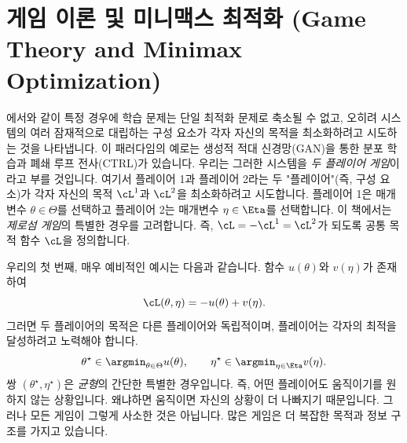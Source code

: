 \documentclass[../../book-main_ko.tex]{subfiles}
\begin{document}
\section{게임 이론 및 미니맥스 최적화 (Game Theory and Minimax Optimization)} \label{sec:minimax}\label{sec:game_theory}

에서와 같이 특정 경우에 학습 문제는 단일 최적화 문제로 축소될 수 없고, 오히려 시스템의 여러 잠재적으로 대립하는 구성 요소가 각자 자신의 목적을 최소화하려고 시도하는 것을 나타냅니다. 이 패러다임의 예로는 생성적 적대 신경망(GAN)을 통한 분포 학습과 폐쇄 루프 전사(CTRL)가 있습니다. 우리는 그러한 시스템을 \textit{두 플레이어 게임}이라고 부를 것입니다. 여기서 플레이어 1과 플레이어 2라는 두 "플레이어"(즉, 구성 요소)가 각자 자신의 목적 \(\cL^{1}\)과 \(\cL^{2}\)을 최소화하려고 시도합니다. 플레이어 1은 매개변수 \(\theta \in \Theta\)를 선택하고 플레이어 2는 매개변수 \(\eta \in \Eta\)를 선택합니다. 이 책에서는 \textit{제로섬 게임}의 특별한 경우를 고려합니다. 즉, \(\cL = -\cL^{1} = \cL^{2}\)가 되도록 공통 목적 함수 \(\cL\)을 정의합니다.

우리의 첫 번째, 매우 예비적인 예시는 다음과 같습니다. 함수 \(u(\theta)\)와 \(v(\eta)\)가 존재하여
\begin{equation}
    \cL(\theta, \eta) = -u(\theta) + v(\eta).
\end{equation}
그러면 두 플레이어의 목적은 다른 플레이어와 독립적이며, 플레이어는 각자의 최적을 달성하려고 노력해야 합니다.
\begin{equation}
    \theta^{\star} \in \argmin_{\theta \in \Theta}u(\theta), \qquad \eta^{\star} \in \argmin_{\eta \in \Eta}v(\eta).
\end{equation}
쌍 \((\theta^{\star}, \eta^{\star})\)은 \textit{균형}의 간단한 특별한 경우입니다. 즉, 어떤 플레이어도 움직이기를 원하지 않는 상황입니다. 왜냐하면 움직이면 자신의 상황이 더 나빠지기 때문입니다. 그러나 모든 게임이 그렇게 사소한 것은 아닙니다. 많은 게임은 더 복잡한 목적과 정보 구조를 가지고 있습니다.
\end{document}
